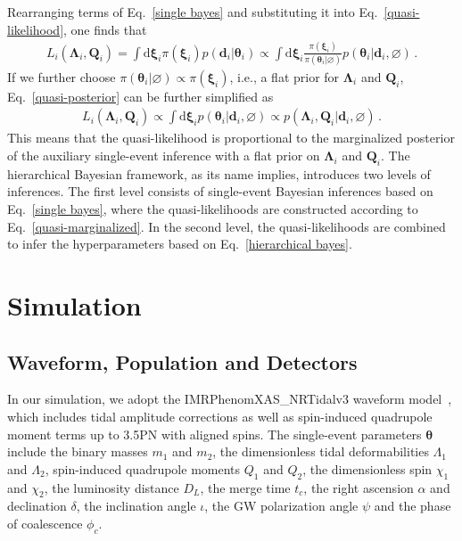 \documentclass[a4paper,11pt]{article}
\begin{document}
Rearranging terms of Eq.~\eqref{single bayes} and substituting it into
Eq.~\eqref{quasi-likelihood}, one finds that
\begin{equation}
\label{quasi-posterior}
\begin{aligned}
    L_i(\bm{\Lambda}_i,\bm{Q}_i) = \int \text{d}\bm{\xi}_i \pi(\bm{\xi}_i)p(\bm{d}_i|\bm{\theta}_i) \propto \int \text{d}\bm{\xi}_i \frac{\pi(\bm{\xi}_i)}{\pi(\bm{\theta}_i|\varnothing)}p(\bm{\theta}_i|\bm{d}_i,\varnothing)\,.
\end{aligned}  
\end{equation}
If we further choose $\pi(\bm{\theta}_i|\varnothing)\propto\pi(\bm{\xi}_i)$, 
i.e., a flat prior for $\bm{\Lambda}_i$ and $\bm{Q}_i$, Eq.~\eqref{quasi-posterior} can be further simplified as 
\begin{equation}
\label{quasi-marginalized}
\begin{aligned}
    L_i(\bm{\Lambda}_i,\bm{Q}_i) \propto \int \text{d}\bm{\xi}_i p(\bm{\theta}_i|\bm{d}_i,\varnothing)\propto p(\bm{\Lambda}_i,\bm{Q}_i|\bm{d}_i,\varnothing)\,.
\end{aligned}  
\end{equation}
This means that the quasi-likelihood is proportional to the marginalized
posterior of the auxiliary single-event inference with a flat prior on
$\bm{\Lambda}_i$ and $\bm{Q}_i$. The
hierarchical Bayesian framework, as its name implies, introduces two levels of 
inferences. The first level 
consists of single-event Bayesian inferences based on Eq.~\eqref{single bayes},
where the quasi-likelihoods are constructed according to
Eq.~\eqref{quasi-marginalized}. In the second level, the quasi-likelihoods are
combined to infer the hyperparameters based on Eq.~\eqref{hierarchical bayes}.


\section{Simulation}
\label{sec:simulation}

\subsection{Waveform, Population and Detectors}
\label{subsec:simulation_preliminaries}

In our simulation, we adopt the {\sc IMRPhenomXAS\_NRTidalv3} waveform model~\cite{Abac:2023ujg}, 
which includes tidal amplitude corrections as well as spin-induced quadrupole
moment terms up to 3.5PN with aligned spins.
The single-event parameters $\bm{\theta}$ include 
 the binary masses $m_1$ and $m_2$, the 
dimensionless tidal deformabilities $\Lambda_1$ and $\Lambda_2$, spin-induced 
quadrupole moments $Q_1$ and $Q_2$, the dimensionless spin $\chi_1$ and $\chi_2$, the 
luminosity distance $D_L$, the merge time $t_c$, the right ascension $\alpha$ and 
declination $\delta$, the inclination angle $\iota$, the GW polarization angle 
$\psi$ and the phase of coalescence $\phi_c$.
\end{document}
